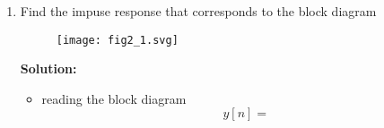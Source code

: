 \documentclass{article}
\begin{document}
\begin{enumerate}
	\item Find the impuse response that corresponds to the block diagram

	      \begin{figure}
		      \centering
		      \texttt{[image: fig2\_1.svg]}
	      \end{figure}
	      \textbf{Solution:}
	      \begin{itemize}
		      \item reading the block diagram
		            \[
			            y[n] =
		            \]
	      \end{itemize}

\end{enumerate}
\end{document}

